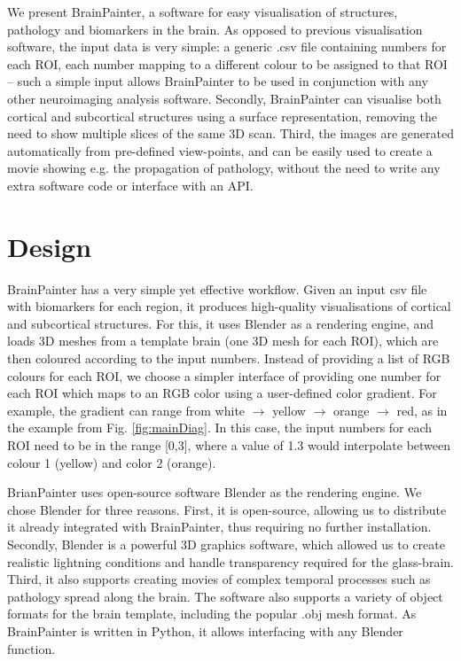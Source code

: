 \documentclass{llncs}
\begin{document}
We present BrainPainter, a software for easy visualisation of structures, pathology and biomarkers in the brain. As opposed to previous visualisation software, the input data is very simple: a generic .csv file containing numbers for each ROI, each number mapping to a different colour to be assigned to that ROI -- such a simple input allows BrainPainter to be used in conjunction with any other neuroimaging analysis software. Secondly, BrainPainter can visualise both cortical and subcortical structures using a surface representation, removing the need to show multiple slices of the same 3D scan. Third, the images are generated automatically from pre-defined view-points, and can be easily used to create a movie showing e.g. the propagation of pathology, without the need to write any extra software code or interface with an API.


\FloatBarrier
\section{Design}
\label{design}



BrainPainter has a very simple yet effective workflow. Given an input csv file with biomarkers for each region, it produces high-quality visualisations of cortical and subcortical structures. For this, it uses Blender as a rendering engine, and loads 3D meshes from a template brain (one 3D mesh for each ROI), which are then coloured according to the input numbers. Instead of providing a list of RGB colours for each ROI, we choose a simpler interface of providing one number for each ROI which maps to an RGB color using a user-defined color gradient. For example, the gradient can range from white $\rightarrow$ yellow $\rightarrow$ orange $\rightarrow$ red, as in the example from Fig. \ref{fig:mainDiag}. In this case, the input numbers for each ROI need to be in the range [0,3], where a value of 1.3 would interpolate between colour 1 (yellow) and color 2 (orange).

BrianPainter uses open-source software Blender as the rendering engine. We chose Blender for three reasons. First, it is open-source, allowing us to distribute it already integrated with BrainPainter, thus requiring no further installation. Secondly, Blender is a powerful 3D graphics software, which allowed us to create realistic lightning conditions and handle transparency required for the glass-brain. Third, it also supports creating movies of complex temporal processes such as pathology spread along the brain. The software also supports a variety of object formats for the brain template, including the popular .obj mesh format. As BrainPainter is written in Python, it allows interfacing with any Blender function.
\end{document}

